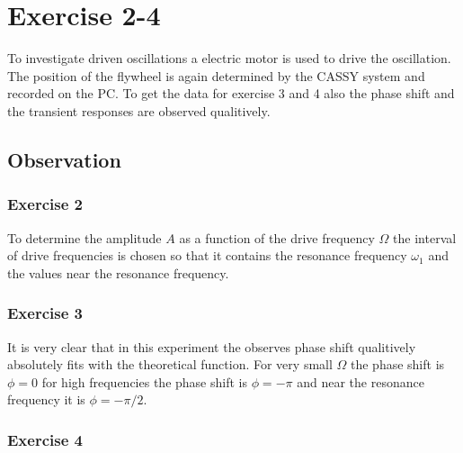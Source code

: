 \section{Exercise 2-4}
To investigate driven oscillations a electric motor is used to drive the oscillation.
The position of the flywheel is again determined by the CASSY system and recorded
on the PC. To get the data for exercise 3 and 4 also the phase shift and the 
transient responses are observed qualitively.

\subsection{Observation}
\subsubsection{Exercise 2}
To determine the amplitude \(A\) as a function of the drive frequency \(\Omega\) 
the interval of drive frequencies is chosen so that it contains the resonance frequency 
\(\omega_1\) and the values near the resonance frequency.
  
\subsubsection{Exercise 3}
It is very clear that in this experiment the observes phase shift qualitively absolutely fits
with the theoretical function. For very small \(\Omega\) the phase shift is \(\phi
= 0\) for high frequencies the phase shift is \(\phi = - \pi\) and near the resonance
frequency it is \(\phi = -\pi/2 \).
\subsubsection{Exercise 4}
